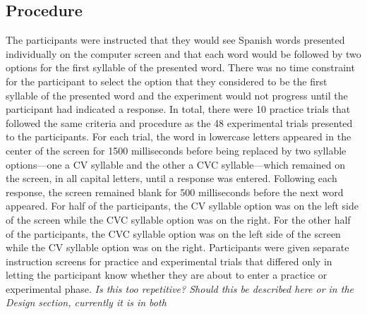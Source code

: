 \subsection{Procedure}

The participants were instructed that they would see Spanish words presented individually on the computer screen and that each word would be followed by two options for the first syllable of the presented word. There was no time constraint for the participant to select the option that they considered to be the first syllable of the presented word and the experiment would not progress until the participant had indicated a response. %
In total, there were 10 practice trials that followed the same criteria and procedure as the 48 experimental trials presented to the participants. %
For each trial, the word in lowercase letters appeared in the center of the screen for 1500 milliseconds before being replaced by two syllable options---one a CV syllable and the other a CVC syllable---which remained on the screen, in all capital letters, until a response was entered. Following each response, the screen remained blank for 500 milliseconds before the next word appeared. %
For half of the participants, the CV syllable option was on the left side of the screen while the CVC syllable option was on the right. For the other half of the participants, the CVC syllable option was on the left side of the screen while the CV syllable option was on the right. Participants were given separate instruction screens for practice and experimental trials that differed only in letting the participant know whether they are about to enter a practice or experimental phase. \emph{Is this too repetitive? Should this be described here or in the Design section, currently it is in both} %


